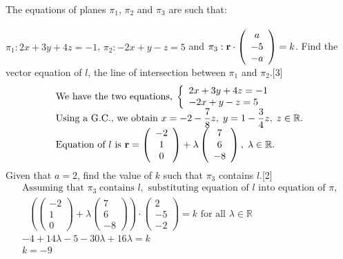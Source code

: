 \documentclass[12pt, a4 paper]{article}
\begin{document}
\begin{outline}[enumerate]
					\color{black}
					\1 The equations of planes ${\pi _1}$, ${\pi _2}$ and ${\pi _3}$ are such that: \\\\
					${\pi _1}:2x + 3y + 4z =  - 1$, \;\;  ${\pi _2}: - 2x + y - z = 5$ \;\;  and\;\;   ${\pi _3}:{\bf{r}} \cdot \left( {\begin{array}{*{20}{c}}a\\{ - 5}\\{ - a}\end{array}} \right) = k$.
					\2 Find the vector equation of $l$, the line of intersection between ${\pi _1}$ and ${\pi _2}$.\hfill[3]
					\color{blue}
					\[\begin{array}{l}{\textrm{We have the two equations,}}\;\left\{ \begin{array}{l}2x + 3y + 4z =  - 1\\ - 2x + y - z = 5\end{array} \right.\\{\textrm{Using a G}}{\textrm{.C}}{\textrm{., we obtain }}x =  - 2 - \dfrac{7}{8}z,\;y = 1 - \dfrac{3}{4}z,\;z \in \mathbb{R}.\\{\textrm{Equation of }}l{\textrm{ is }}{\bf{r}} = \left( {\begin{array}{*{20}{c}}{ - 2}\\1\\0\end{array}} \right) + \lambda \left( {\begin{array}{*{20}{c}}7\\6\\{ - 8}\end{array}} \right),\;\lambda  \in \mathbb{R}.\end{array}\]
					\color{black}
					\2 Given that $a = 2$, find the value of $k$ such that ${\pi _3}$ contains $l$.\hfill[2]
					\color{blue}
					\[\begin{array}{l}{\textrm{Assuming that }}{\pi _3}\;{\textrm{contains }}l,{\textrm{ substituting equation of }}l{\textrm{ into equation of }}\pi {\textrm{,}}\\{\textrm{ }}\left( {\left( {\begin{array}{*{20}{c}}{ - 2}\\1\\0\end{array}} \right) + \lambda \left( {\begin{array}{*{20}{c}}7\\6\\{ - 8}\end{array}} \right)} \right) \cdot \left( {\begin{array}{*{20}{c}}2\\{ - 5}\\{ - 2}\end{array}} \right) = k{\textrm{ for all }}\lambda  \in \mathbb{R}\\ - 4 + 14\lambda  - 5 - 30\lambda  + 16\lambda  = k\\k =  - 9\end{array}\]
															            

\end{outline}
\end{document}
